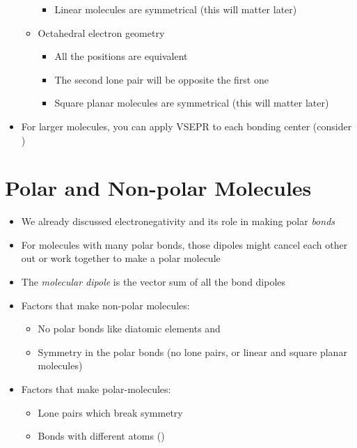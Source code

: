 \documentclass[12pt, openany, letterpaper]{memoir}
\begin{document}
\begin{itemize}
\begin{itemize}
\begin{itemize}
			            \item Linear molecules are symmetrical (this will matter later)
		            \end{itemize}
		      \item Octahedral electron geometry
		            \begin{itemize}
			            \item All the positions are equivalent
			            \item The second lone pair will be opposite the first one
			            \item Square planar molecules are symmetrical (this will matter later)
		            \end{itemize}
	      \end{itemize}
	\item For larger molecules, you can apply VSEPR to each bonding center (consider )
\end{itemize}
\section{Polar and Non-polar Molecules}
\begin{itemize}
	\item We already discussed electronegativity and its role in making polar \emph{bonds}
	\item For molecules with many polar bonds, those dipoles might cancel each other out or work together to make a polar molecule
	\item The \emph{molecular dipole} is the vector sum of all the bond dipoles
	\item Factors that make non-polar molecules:
	      \begin{itemize}
		      \item No polar bonds like diatomic elements and 
		      \item Symmetry in the polar bonds (no lone pairs, or linear and square planar molecules)
	      \end{itemize}
	\item Factors that make polar-molecules:
	      \begin{itemize}
		      \item Lone pairs which break symmetry
		      \item Bonds with different atoms ()
	      \end{itemize}
\end{itemize}
\end{document}
